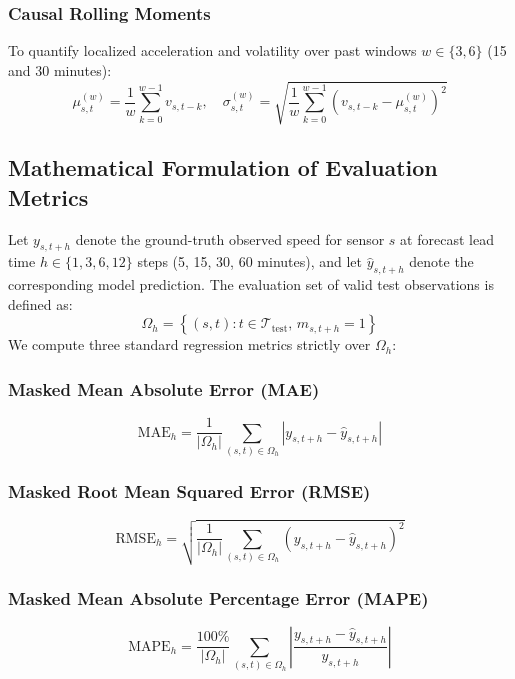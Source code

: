 \documentclass[conference]{IEEEtran}
\begin{document}
\subsubsection{Causal Rolling Moments}
To quantify localized acceleration and volatility over past windows $w \in \{3, 6\}$ (15 and 30 minutes):
\begin{equation}
\mu_{s,t}^{(w)} = \frac{1}{w} \sum_{k=0}^{w-1} v_{s,t-k}, \quad
\sigma_{s,t}^{(w)} = \sqrt{\frac{1}{w} \sum_{k=0}^{w-1} \left( v_{s,t-k} - \mu_{s,t}^{(w)} \right)^2}
\end{equation}

\subsection{Mathematical Formulation of Evaluation Metrics}
Let $y_{s,t+h}$ denote the ground-truth observed speed for sensor $s$ at forecast lead time $h \in \{1, 3, 6, 12\}$ steps (5, 15, 30, 60 minutes), and let $\hat{y}_{s,t+h}$ denote the corresponding model prediction. The evaluation set of valid test observations is defined as:
\begin{equation}
\Omega_h = \left\{ (s, t) : t \in \mathcal{T}_{\text{test}}, \, m_{s,t+h} = 1 \right\}
\end{equation}
We compute three standard regression metrics strictly over $\Omega_h$:

\subsubsection{Masked Mean Absolute Error (MAE)}
\begin{equation}
\text{MAE}_h = \frac{1}{|\Omega_h|} \sum_{(s,t) \in \Omega_h} \left| y_{s,t+h} - \hat{y}_{s,t+h} \right|
\end{equation}

\subsubsection{Masked Root Mean Squared Error (RMSE)}
\begin{equation}
\text{RMSE}_h = \sqrt{ \frac{1}{|\Omega_h|} \sum_{(s,t) \in \Omega_h} \left( y_{s,t+h} - \hat{y}_{s,t+h} \right)^2 }
\end{equation}

\subsubsection{Masked Mean Absolute Percentage Error (MAPE)}
\begin{equation}
\text{MAPE}_h = \frac{100\%}{|\Omega_h|} \sum_{(s,t) \in \Omega_h} \left| \frac{y_{s,t+h} - \hat{y}_{s,t+h}}{y_{s,t+h}} \right|
\end{equation}
\end{document}
